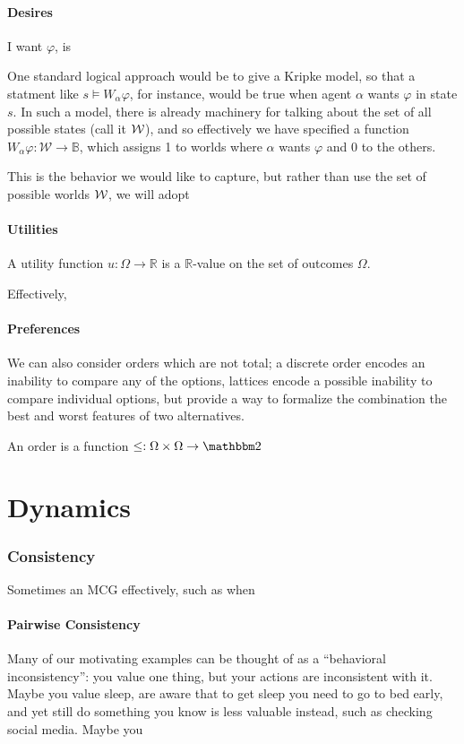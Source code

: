 \documentclass{article}
\begin{document}
	\subsection{Desires}
	
	I want $\varphi$, is 
	
	One standard logical approach would be to give a Kripke model, so that a statment like $s \vDash W_{\alpha} \varphi$, for instance, would be true when agent $\alpha$ wants $\varphi$ in state $s$. In such a model, there is already machinery for talking about the set of all possible states (call it $\cal W$), and so effectively we have specified a function $W_\alpha \varphi: \mathcal W \to \mathbb B$, which assigns 1 to worlds where $\alpha$ wants $\varphi$ and 0 to the others.
	
	This is the behavior we would like to capture, but rather than use the set of possible worlds $\cal W$, we will adopt 
	
	
	\subsection{Utilities}
	
		
	
	A utility function $u : \Omega \to \mathbb R$ is a $\mathbb R$-value on the set of outcomes $\Omega$. 
	
	Effectively, 

	
	\subsection{Preferences}
	We can also consider orders which are not total; a discrete order encodes an inability to compare any of the options, lattices encode a possible inability to compare individual options, but provide a way to formalize the combination the best and worst features of two alternatives.
	
	
	An order is a function $\leq: \Omega \times \Omega \to \mathbbm 2$
	
	\part{Dynamics}
	
	\section{Consistency}
	Sometimes an MCG effectively, such as when 
%	
	
	\subsection{Pairwise Consistency}
	Many of our motivating examples can be thought of as a ``behavioral inconsistency'': you value one thing, but your actions are inconsistent with it. Maybe you value sleep, are aware that to get sleep you need to go to bed early, and yet still do something you know is less valuable instead, such as checking social media. Maybe you 
\end{document}
